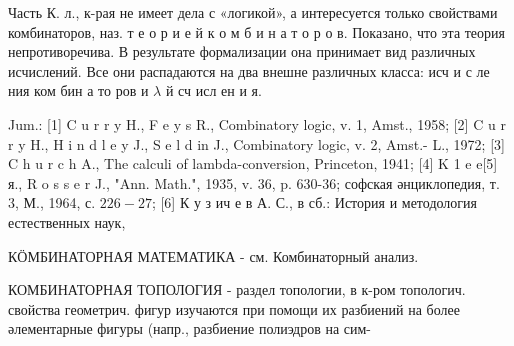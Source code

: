 \documentclass[10pt]{article}
\begin{document}
Часть К. л., к-рая не имеет дела с «логикой», а интересуется только свойствами комбинаторов, наз. т е о р и е й к о м б и н а т о р о в. Показано, что эта теория непротиворечива. В результате формализации она принимает вид различных исчислений. Все они распадаются на два внешне различных класса: исч и с ле ния ком бин а то ров и $\lambda$ й сч исл ен и я.



Jum.: [1] C u r r y H., F e y s R., Combinatory logic, v. 1, Amst., 1958; [2] C u r r y H., H i n d l e y J., S e l d in J., Combinatory logic, v. 2, Amst.- L., 1972; [3] C h u r c h A., The calculi of lambda-conversion, Princeton, 1941; [4] K 1 e e[5] я., R o s s e r J., "Ann. Math.", 1935, v. 36, p. 630-36; софская әнциклопедия, т. 3, М., 1964, с. $226-27$; [6] К у з ич е в А. С., в сб.: История и методология естественных наук,



КӦМБИНАТОРНАЯ МАТЕМАТИКА - см. Комбинаторный анализ.

КОМБИНАТОРНАЯ ТОПОЛОГИЯ - раздел топологии, в к-ром топологич. свойства геометрич. фигур изучаются при помощи их разбиений на более әлементарные фигуры (напр., разбиение полиэдров на сим-
\end{document}
